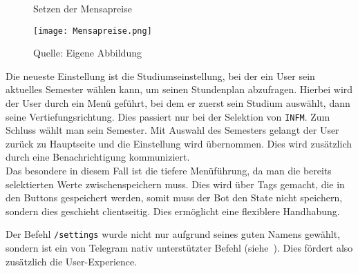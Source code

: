 \begin{figure}[H]
    \centering
    \caption{Setzen der Mensapreise}
      \texttt{[image: Mensapreise.png]}
      \label{img:mensapreise}
    \caption*{Quelle: Eigene Abbildung}
\end{figure}

Die neueste Einstellung ist die Studiumseinstellung, bei der ein User sein aktuelles Semester wählen kann, um seinen Stundenplan abzufragen. Hierbei wird der User durch ein Menü geführt, bei dem er zuerst sein Studium auswählt, dann seine Vertiefungsrichtung. Dies passiert nur bei der Selektion von \texttt{INFM}. Zum Schluss wählt man sein Semester. Mit Auswahl des Semesters gelangt der User zurück zu Hauptseite und die Einstellung wird übernommen. Dies wird zusätzlich durch eine Benachrichtigung kommuniziert. \\
Das besondere in diesem Fall ist die tiefere Menüführung, da man die bereits selektierten Werte zwischenspeichern muss. Dies wird über Tags gemacht, die in den Buttons gespeichert werden, somit muss der Bot den State nicht speichern, sondern dies geschieht clientseitig. Dies ermöglicht eine flexiblere Handhabung.

Der Befehl \texttt{/settings} wurde nicht nur aufgrund seines guten Namens gewählt, sondern ist ein von Telegram nativ unterstützter Befehl (siehe~). Dies fördert also zusätzlich die User-Experience.

